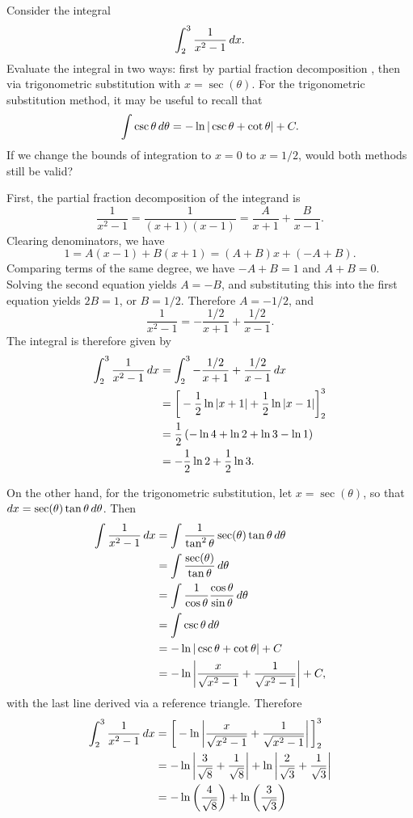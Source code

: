 \documentclass[noauthor, handout]{ximera}
\begin{document}
\begin{problem}
Consider the integral
$$
\int_2^3 \frac{1}{x^2-1} \mathop{}\!d x.
$$
Evaluate the integral in two ways: first by partial fraction decomposition , then via trigonometric substitution with $x=\sec(\theta)$. For the trigonometric substitution method, it may be useful to recall that
$$
\int \csc \theta \mathop{}\!d \theta = -\ln | \csc \theta + \cot \theta | + C.
$$
If we change the bounds of integration to $x=0$ to $x=1/2$, would both methods still be valid?
\end{problem}

\begin{freeResponse}
 
First, the partial fraction decomposition of the integrand is 
$$
\frac{1}{x^2-1} = \frac{1}{(x+1)(x-1)} = \frac{A}{x+1} + \frac{B}{x-1}.
$$
Clearing denominators, we have
$$
1 = A(x-1) + B(x+1) = (A+B)x + (-A+B).
$$
Comparing terms of the same degree, we have $-A+B=1$ and $A+B = 0$. Solving the second equation yields $A=-B$, and substituting this into the first equation yields $2B=1$, or $B=1/2$. Therefore $A=-1/2$, and 
$$
\frac{1}{x^2-1} = -\frac{1/2}{x+1} + \frac{1/2}{x-1}.
$$
The integral is therefore given by
\begin{align*}
\int_2^3 \frac{1}{x^2-1} \mathop{}\!d x &= \int_2^3  -\frac{1/2}{x+1} + \frac{1/2}{x-1} \mathop{}\!d x \\
&= \bigg[ -\frac{1}{2} \ln |x+1| + \frac{1}{2} \ln |x-1|  \bigg]_2^3 \\
&= \frac{1}{2}\left(- \ln 4 + \ln 2 + \ln 3 - \ln 1\right) \\
&=  -\frac{1}{2} \ln 2 + \frac{1}{2} \ln 3.
\end{align*}

On the other hand, for the trigonometric substitution, let $x=\sec(\theta)$, so that $\mathop{}\!d x = \sec(\theta) \tan \theta \mathop{}\!d \theta$. Then
\begin{align*}
\int \frac{1}{x^2-1} \mathop{}\!d x &= \int \frac{1}{\tan^2 \theta} \sec(\theta) \tan \theta \mathop{}\!d \theta \\
&= \int \frac{\sec(\theta)}{\tan \theta} \mathop{}\!d \theta \\
&= \int \frac{1}{\cos \theta} \frac{\cos \theta}{\sin \theta} \mathop{}\!d \theta \\
&= \int \csc \theta \mathop{}\!d \theta \\
&=  - \ln |\csc \theta + \cot \theta| + C \\
&= - \ln \left|\frac{x}{\sqrt{x^2-1}} + \frac{1}{\sqrt{x^2-1}}\right|+C,
\end{align*}
with the last line derived via a reference triangle. Therefore
\begin{align*}
\int_2^3 \frac{1}{x^2-1} \mathop{}\!d x &= \bigg[ -\ln \left|\frac{x}{\sqrt{x^2-1}} + \frac{1}{\sqrt{x^2-1}}\right| \bigg]_2^3 \\
&= -\ln \left|\frac{3}{\sqrt{8}} + \frac{1}{\sqrt{8}}\right| + \ln \left| \frac{2}{\sqrt{3}} + \frac{1}{\sqrt{3}}\right|\\
&= -\ln \left(\frac{4}{\sqrt{8}}\right) + \ln \left(\frac{3}{\sqrt{3}}\right) \\
\end{align*}


\end{freeResponse}
\end{document}

